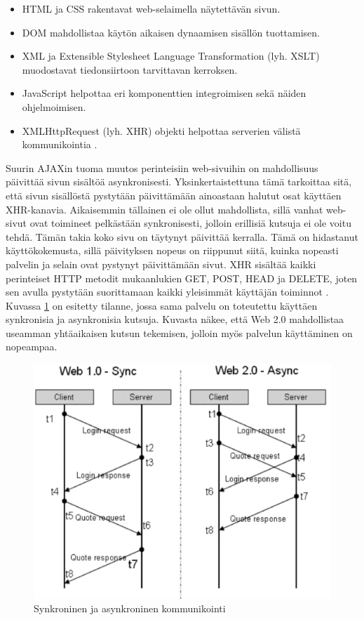 \begin{itemize}
\item HTML ja CSS rakentavat web-selaimella näytettävän sivun.
\item DOM mahdollistaa käytön aikaisen dynaamisen sisällön tuottamisen.
\item XML ja Extensible Stylesheet Language Transformation (lyh. XSLT) muodostavat tiedonsiirtoon tarvittavan kerroksen.
\item JavaScript helpottaa eri komponenttien integroimisen sekä näiden ohjelmoimisen.
\item XMLHttpRequest (lyh. XHR) objekti helpottaa serverien välistä kommunikointia \cite{WEB2b}.
\end{itemize}

Suurin AJAXin tuoma muutos perinteisiin web-sivuihin on mahdollisuus päivittää sivun sisältöä asynkronisesti. Yksinkertaistettuna tämä tarkoittaa sitä, että sivun sisällöstä
pystytään päivittämään ainoastaan halutut osat käyttäen XHR-kanavia. Aikaisemmin tällainen ei ole ollut mahdollista, sillä vanhat web-sivut ovat toimineet pelkästään synkronisesti, jolloin 
erillisiä kutsuja ei ole voitu tehdä. Tämän takia koko sivu on täytynyt päivittää kerralla. Tämä on hidastanut käyttökokemusta, sillä päivityksen nopeus on riippunut siitä, 
kuinka nopeasti palvelin ja selain ovat pystynyt päivittämään sivut. XHR sisältää kaikki perinteiset HTTP metodit mukaanlukien GET, POST, HEAD ja DELETE, joten sen avulla pystytään suorittamaan
kaikki yleisimmät käyttäjän toiminnot \cite{WEB2}. Kuvassa \ref{synkroninen} on esitetty tilanne, jossa sama palvelu on toteutettu käyttäen synkronisia ja asynkronisia 
kutsuja. Kuvasta näkee, että Web 2.0 mahdollistaa useamman yhtäaikaisen kutsun tekemisen, jolloin myös palvelun käyttäminen on nopeampaa.

\begin{figure}[htp]
\centering
\includegraphics[width=12cm]{pics/synkroninen.pdf}
\caption{Synkroninen ja asynkroninen kommunikointi}
\label{synkroninen}
\end{figure}

